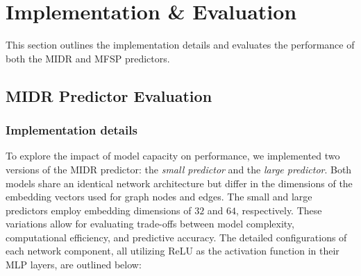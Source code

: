 \section{Implementation \& Evaluation}
\label{sec:evaluation}
This section outlines the implementation details and evaluates the performance of both the MIDR and MFSP predictors.

\subsection{MIDR Predictor Evaluation}
\label{subsec:mdrp_eval}

\subsubsection{Implementation details}
To explore the impact of model capacity on performance, we implemented two versions of the MIDR predictor: the {\em{small predictor}} and the {\em{large predictor}}. Both models share an identical network architecture but differ in the dimensions of the embedding vectors used for graph nodes and edges. The small and large predictors employ embedding dimensions of $32$ and $64$, respectively. These variations allow for evaluating trade-offs between model complexity, computational efficiency, and predictive accuracy. The detailed configurations of each network component, all utilizing ReLU as the activation function in their MLP layers, are outlined below:
